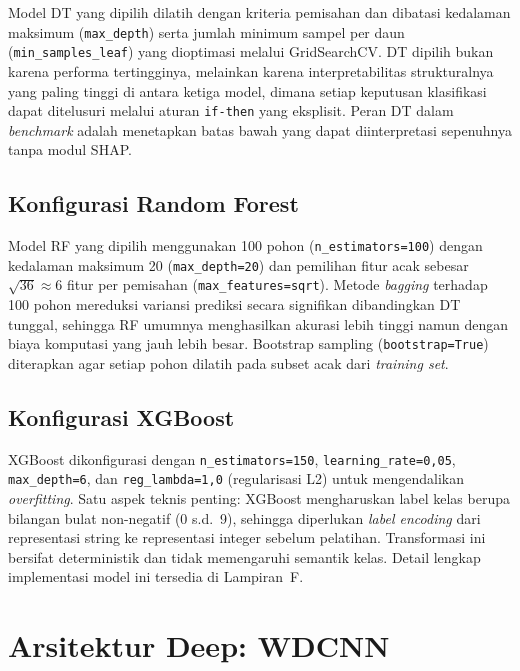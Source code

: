 Model DT yang dipilih dilatih dengan kriteria pemisahan dan dibatasi kedalaman maksimum
(\texttt{max\_depth}) serta jumlah minimum sampel per daun
(\texttt{min\_samples\_leaf}) yang dioptimasi melalui GridSearchCV.
DT dipilih bukan karena performa tertingginya, melainkan karena interpretabilitas
strukturalnya yang paling tinggi di antara ketiga model, dimana setiap keputusan
klasifikasi dapat ditelusuri melalui aturan \texttt{if-then} yang eksplisit.
Peran DT dalam \emph{benchmark} adalah menetapkan batas bawah yang dapat
diinterpretasi sepenuhnya tanpa modul SHAP.

\subsection{Konfigurasi Random Forest}
\label{subsec:bab4_rf_config}

Model RF yang dipilih menggunakan 100 pohon (\texttt{n\_estimators=100}) dengan kedalaman
maksimum 20 (\texttt{max\_depth=20}) dan pemilihan fitur acak sebesar
$\sqrt{36} \approx 6$ fitur per pemisahan (\texttt{max\_features=\textquotesingle sqrt\textquotesingle}).
Metode \emph{bagging} terhadap 100 pohon mereduksi variansi prediksi secara signifikan
dibandingkan DT tunggal, sehingga RF umumnya menghasilkan akurasi lebih
tinggi namun dengan biaya komputasi yang jauh lebih besar.
Bootstrap sampling (\texttt{bootstrap=True}) diterapkan agar setiap pohon
dilatih pada subset acak dari \emph{training set}.

\subsection{Konfigurasi XGBoost}
\label{subsec:bab4_xgb_config}

XGBoost dikonfigurasi dengan \texttt{n\_estimators=150},
\texttt{learning\_rate=0{,}05}, \texttt{max\_depth=6}, dan
\texttt{reg\_lambda=1{,}0} (regularisasi L2) untuk mengendalikan
\emph{overfitting}.
Satu aspek teknis penting: XGBoost mengharuskan label kelas berupa bilangan
bulat non-negatif (0 s.d.\ 9), sehingga diperlukan \emph{label encoding}
dari representasi string ke representasi integer sebelum pelatihan.
Transformasi ini bersifat deterministik dan tidak memengaruhi semantik
kelas. Detail lengkap implementasi model ini tersedia di Lampiran~F.

\section{Arsitektur Deep: WDCNN}
\label{sec:bab4_wdcnn}

